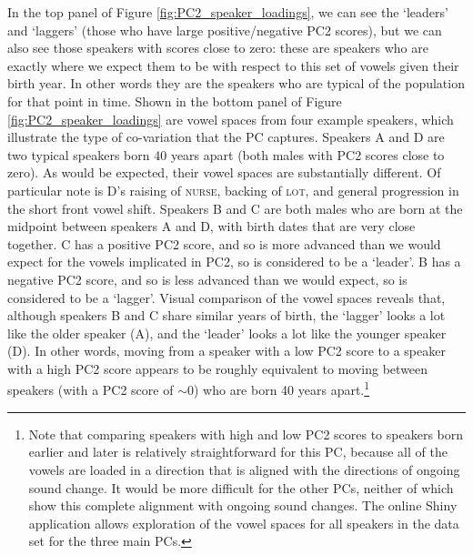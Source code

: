 \documentclass[review]{elsarticle} %
\begin{document}
In the top panel of Figure \ref{fig:PC2_speaker_loadings}, we can see the `leaders' and `laggers' (those who have large positive/negative PC2 scores), but we can also see those speakers with scores close to zero: these are speakers who are exactly where we expect them to be with respect to this set of vowels given their birth year. In other words they are the speakers who are typical of the population for that point in time. Shown in the bottom panel of Figure \ref{fig:PC2_speaker_loadings} are vowel spaces from four example speakers, which illustrate the type of co-variation that the PC captures. Speakers A and D are two typical speakers born 40 years apart (both males with PC2 scores close to zero).  As would be expected, their vowel spaces are substantially different. Of particular note is D's raising of \textsc{nurse}, backing of \textsc{lot}, and general progression in the short front vowel shift. Speakers B and C are both males who are born at the midpoint between speakers A and D, with birth dates that are very close together. C has a positive PC2 score, and so is more advanced than we would expect for the vowels implicated in PC2, so is considered to be a `leader'.  B has a negative PC2 score, and so is less advanced than we would expect, so is considered to be a `lagger'.  Visual comparison of the vowel spaces reveals that, although speakers B and C share similar years of birth, the `lagger' looks a lot like the older speaker (A), and the `leader' looks a lot like the younger speaker (D). In other words, moving from a speaker with a low PC2 score to a speaker with a high PC2 score appears to be roughly equivalent to moving between speakers (with a PC2 score of $\sim$0) who are born 40 years apart.\footnote{Note that comparing speakers with high and low PC2 scores to speakers born earlier and later is relatively straightforward for this PC, because all of the vowels are loaded in a direction that is aligned with the directions of ongoing sound change.  It would be more difficult for the other PCs, neither of which show this complete alignment with ongoing sound changes. The online Shiny application allows exploration of the vowel spaces for all speakers in the data set for the three main PCs.}

\end{document}
